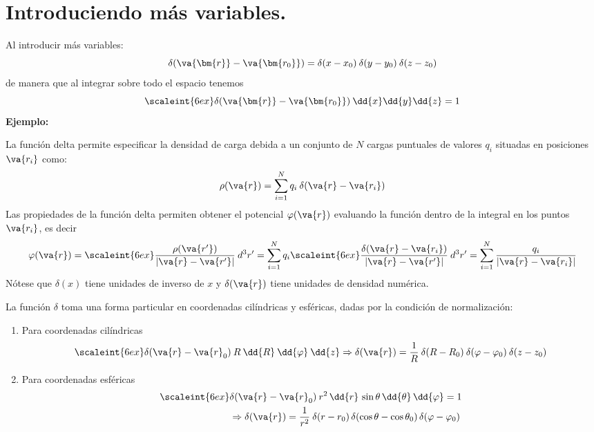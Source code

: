\section{Introduciendo más variables.}

Al introducir más variables:
\begin{equation}
\delta (\va{\bm{r}} - \va{\bm{r_{0}}}) = \delta (x - x_{0}) \: \delta (y - y_{0}) \: \delta (z - z_{0})
\label{eq:ecuacion_A_03}
\end{equation}
de manera que al integrar sobre todo el espacio tenemos
\[ \scaleint{6ex} \delta (\va{\bm{r}} - \va{\bm{r_{0}}}) \: \dd{x} \dd{y}  \dd{z} = 1 \]
\textbf{Ejemplo:}

La función delta permite especificar la densidad de carga debida a un conjunto de $N$ cargas puntuales de valores $q_{i}$ situadas en posiciones $\va{r_{i}}$  como:
\begin{equation}
\rho (\va{r}) = \sum_{i=1}^{N} q_{i} \: \delta(\va{r} - \va{r_{i}})
\label{eq:ecuacion_A_04}
\end{equation}
Las propiedades de la función delta permiten obtener el potencial $\varphi(\va{r})$ evaluando la función dentro de la integral en los puntos $\va{r_{i}}$, es decir
\begin{equation}
\varphi(\va{r}) = \scaleint{6ex} \dfrac{\rho(\va{r^{\prime}})}{\vert \va{r} - \va{r^{\prime}} \vert} \: d^{3}r^{\prime} = \sum_{i=1}^{N} q_{i} \scaleint{6ex} \dfrac{\delta ( \va{r} - \va{r_{i}})}{\vert \va{r} - \va{r^{\prime}} \vert} \: d^{3}r^{\prime} = \sum_{i=1}^{N} \dfrac{q_{i}}{\vert \va{r} - \va{r_{i}} \vert}
\label{eq:ecuacion_A_05}
\end{equation}
Nótese que $\delta (x)$ tiene unidades de inverso de $x$ y $\delta (\va{r})$ tiene unidades de densidad numérica.
\par
La función $\delta$ toma una forma particular en coordenadas cilíndricas y esféricas, dadas por la condición de normalización:
\begin{enumerate}
\item Para coordenadas cilíndricas
\begin{equation}
\scaleint{6ex} \delta (\va{r} - \va{r}_{0}) \: R \: \dd{R} \: \dd{\varphi} \: \dd{z} \Rightarrow \delta (\va{r}) =  \dfrac{1}{R} \: \delta (R - R_{0}) \: \delta (\varphi - \varphi_{0}) \: \delta (z - z_{0})
\end{equation}
\item Para coordenadas esféricas
\begin{equation}
\begin{aligned}
\scaleint{6ex} & \delta (\va{r} - \va{r}_{0}) \: r^{2} \, \dd{r} \, \sin \theta \, \dd{\theta} \, \dd{\varphi} = 1 \\
&\Rightarrow \delta (\va{r}) = \dfrac{1}{r^{2}} \: \delta (r - r_{0}) \, \delta (\cos \theta - \cos \theta_{0}) \, \delta (\varphi - \varphi_{0})
\end{aligned}
\end{equation}
\end{enumerate}
